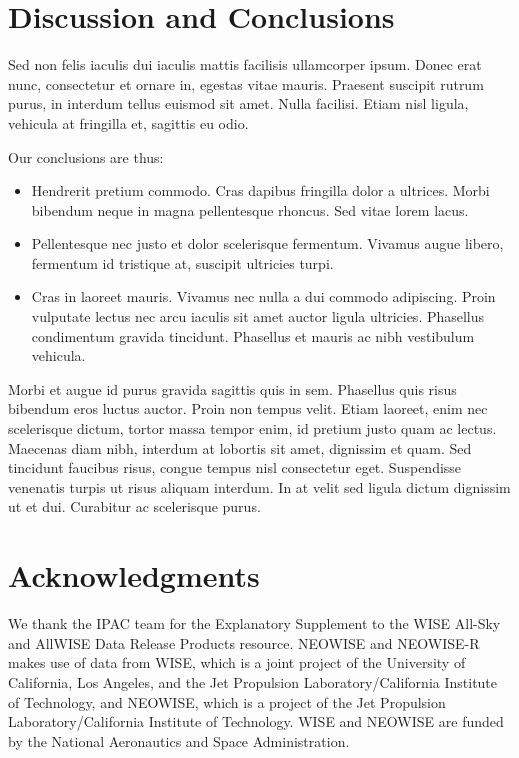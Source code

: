 \documentclass{emulateapj}
\begin{document}
\section{Discussion and Conclusions}
Sed non felis iaculis dui iaculis mattis facilisis ullamcorper
ipsum. Donec erat nunc, consectetur et ornare in, egestas vitae
mauris. Praesent suscipit rutrum purus, in interdum tellus euismod sit
amet. Nulla facilisi. Etiam nisl ligula, vehicula at fringilla et,
sagittis eu odio.

Our conclusions are thus: 
\begin{itemize}
    \item{Hendrerit pretium commodo. Cras dapibus fringilla dolor a
        ultrices. Morbi bibendum neque in magna pellentesque rhoncus. Sed
        vitae lorem lacus.}
    \item{Pellentesque nec justo et dolor scelerisque
        fermentum. Vivamus augue libero, fermentum id tristique at, suscipit
        ultricies turpi.}
    \item{Cras in laoreet mauris. Vivamus nec nulla a dui commodo
        adipiscing. Proin vulputate lectus nec arcu iaculis sit amet auctor
        ligula ultricies. Phasellus condimentum gravida tincidunt. Phasellus
        et mauris ac nibh vestibulum vehicula.}
\end{itemize}

Morbi et augue id purus gravida sagittis quis in sem. Phasellus quis
risus bibendum eros luctus auctor. Proin non tempus velit. Etiam
laoreet, enim nec scelerisque dictum, tortor massa tempor enim, id
pretium justo quam ac lectus. Maecenas diam nibh, interdum at lobortis
sit amet, dignissim et quam. Sed tincidunt faucibus risus, congue
tempus nisl consectetur eget. Suspendisse venenatis turpis ut risus
aliquam interdum. In at velit sed ligula dictum dignissim ut et
dui. Curabitur ac scelerisque purus.



\section{Acknowledgments}
We thank the IPAC team for the Explanatory Supplement to the WISE
All-Sky and AllWISE Data Release Products resource.  NEOWISE and
NEOWISE-R makes use of data from WISE, which is a joint project of the
University of California, Los Angeles, and the Jet Propulsion
Laboratory/California Institute of Technology, and NEOWISE, which is a
project of the Jet Propulsion Laboratory/California Institute of
Technology. WISE and NEOWISE are funded by the National Aeronautics
and Space Administration.
\end{document}
